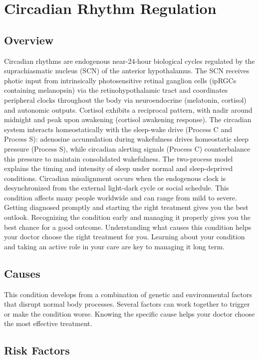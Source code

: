 \chapter{Circadian Rhythm Regulation}
\label{sec:Circadian Rhythm Regulation}

\section{Overview}
Circadian rhythms are endogenous near-24-hour biological cycles regulated by the suprachiasmatic nucleus (SCN) of the anterior hypothalamus. The SCN receives photic input from intrinsically photosensitive retinal ganglion cells (ipRGCs containing melanopsin) via the retinohypothalamic tract and coordinates peripheral clocks throughout the body via neuroendocrine (melatonin, cortisol) and autonomic outputs. Cortisol exhibits a reciprocal pattern, with nadir around midnight and peak upon awakening (cortisol awakening response). The circadian system interacts homeostatically with the sleep-wake drive (Process C and Process S): adenosine accumulation during wakefulness drives homeostatic sleep pressure (Process S), while circadian alerting signals (Process C) counterbalance this pressure to maintain consolidated wakefulness. The two-process model explains the timing and intensity of sleep under normal and sleep-deprived conditions. Circadian misalignment occurs when the endogenous clock is desynchronized from the external light-dark cycle or social schedule. This condition affects many people worldwide and can range from mild to severe. Getting diagnosed promptly and starting the right treatment gives you the best outlook. Recognizing the condition early and managing it properly gives you the best chance for a good outcome. Understanding what causes this condition helps your doctor choose the right treatment for you. Learning about your condition and taking an active role in your care are key to managing it long term.

\section{Causes}
This condition develops from a combination of genetic and environmental factors that disrupt normal body processes. Several factors can work together to trigger or make the condition worse. Knowing the specific cause helps your doctor choose the most effective treatment.

\section{Risk Factors}

